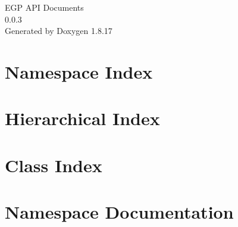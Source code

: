 \let\mypdfximage\pdfximage\def\pdfximage{\immediate\mypdfximage}\documentclass[twoside]{book}
\newcommand{\+}{\discretionary{\mbox{\scriptsize$\hookleftarrow$}}{}{}}
\newcommand{\clearemptydoublepage}{%
  \newpage{\pagestyle{empty}\cleardoublepage}%
}
\begin{document}
\hypersetup{pageanchor=false,
             bookmarksnumbered=true,
             pdfencoding=unicode
            }
\begin{titlepage}
\vspace*{7cm}
\begin{center}%
{\Large E\+GP A\+PI Documents \\[1ex]\large 0.\+0.\+3 }\\
\vspace*{1cm}
{\large Generated by Doxygen 1.8.17}\\
\end{center}
\end{titlepage}
\clearemptydoublepage
{}
\tableofcontents
\clearemptydoublepage
{}
\hypersetup{pageanchor=true}

\chapter{Namespace Index}

\chapter{Hierarchical Index}

\chapter{Class Index}

\chapter{Namespace Documentation}





















\end{document}
